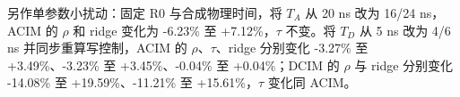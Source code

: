 另作单参数小扰动：固定 R0 与合成物理时间，将 $T_A$ 从 20 ns 改为 16/24 ns，ACIM 的 $\rho$ 和 ridge 变化为 -6.23\% 至 +7.12\%，$\tau$ 不变。将 $T_D$ 从 5 ns 改为 4/6 ns 并同步重算写控制，ACIM 的 $\rho$、$\tau$、ridge 分别变化 -3.27\% 至 +3.49\%、-3.23\% 至 +3.45\%、-0.04\% 至 +0.04\%；DCIM 的 $\rho$ 与 ridge 分别变化 -14.08\% 至 +19.59\%、-11.21\% 至 +15.61\%，$\tau$ 变化同 ACIM。
